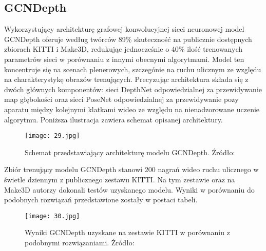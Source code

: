 \subsection{GCNDepth}
Wykorzystujący architekturę grafowej konwolucyjnej sieci neuronowej \cite{GNNBook2022} model GCNDepth \cite{masoumian2021gcndepth} oferuje według twórców 89\% skuteczność na publicznie dostępnych zbiorach KITTI i Make3D, redukując jednocześnie o 40\% ilość trenowanych parametrów sieci w porównaniu z innymi obecnymi algorytmami. Model ten koncentruje się na scenach plenerowych, szczegónie na ruchu ulicznym ze względu na charakterystykę obrazów trenujących. Precyzując architektura składa się z dwóch głównych komponentów: sieci DepthNet odpowiedzialnej za przewidywanie map głębokości oraz sieci PoseNet odpowiedzialnej za przewidywanie pozy aparatu między kolejnymi klatkami wideo ze względu na nienadzorowane uczenie algorytmu. Poniższa ilustracja zawiera schemat opisanej architektury.
\begin{figure}[H]
    \centering
    \texttt{[image: 29.jpg]}
    \caption{Schemat przedstawiający architekturę modelu GCNDepth. Źródło: \cite{GNNBook2022}}
    \label{fig:gcn-schema}
\end{figure}
Zbiór trenujący modelu GCNDepth stanowi 200 nagrań wideo ruchu ulicznego w świetle dziennym z publicznego zestawu KITTI. Na tym zestawie oraz na Make3D autorzy dokonali testów uzyskanego modelu. Wyniki w porównaniu do podobnych rozwiązań przedstawione zostały w postaci tabeli.
\begin{figure}[H]
    \centering
    \texttt{[image: 30.jpg]}
    \caption{Wyniki GCNDepth uzyskane na zestawie KITTI w porównaniu z podobnymi rozwiązaniami. Źródło: \cite{GNNBook2022}}
    \label{fig:gcn-results}
\end{figure}


